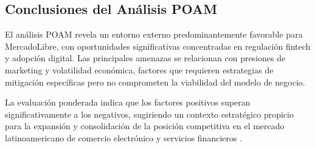 \subsection{Conclusiones del Análisis POAM}

El análisis POAM revela un entorno externo predominantemente favorable para MercadoLibre, con oportunidades significativas concentradas en regulación fintech y adopción digital. Las principales amenazas se relacionan con presiones de marketing y volatilidad económica, factores que requieren estrategias de mitigación específicas pero no comprometen la viabilidad del modelo de negocio.

La evaluación ponderada indica que los factores positivos superan significativamente a los negativos, sugiriendo un contexto estratégico propicio para la expansión y consolidación de la posición competitiva en el mercado latinoamericano de comercio electrónico y servicios financieros \autocite{porter1985}.
